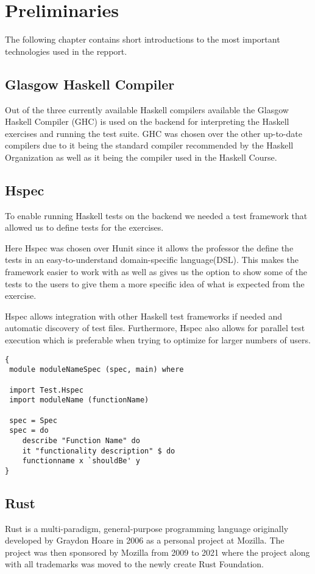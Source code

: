  \chapter{Preliminaries}
The following chapter contains short introductions to the most important technologies used in the repport. 

\section{Glasgow Haskell Compiler} %
Out of the three currently available Haskell compilers available the Glasgow Haskell Compiler (GHC) is used on the backend for interpreting the Haskell exercises and running the test suite. GHC was chosen over the other up-to-date compilers due to it being the standard compiler recommended by the Haskell Organization \cite{Haskell_GHC} as well as it being the compiler used in the Haskell Course.

\section{Hspec}
To enable running Haskell tests on the backend we needed a test framework that allowed us to define tests for the exercises. 

Here Hspec was chosen over Hunit since it allows the professor the define the tests in an easy-to-understand domain-specific language(DSL). 
This makes the framework easier to work with as well as gives us the option to show some of the tests to the users to give them a more specific idea of what is expected from the exercise.

Hspec allows integration with other Haskell test frameworks if needed and automatic discovery of test files. 
Furthermore, Hspec also allows for parallel test execution which is preferable when trying to optimize for larger numbers of users.

\begin{lstlisting}[language=CSharp, caption={An example of a Hspec Test.}, label={lst:HspecTestExample}]
{
 module moduleNameSpec (spec, main) where

 import Test.Hspec
 import moduleName (functionName)
 
 spec = Spec
 spec = do
 	describe "Function Name" do
 	it "functionality description" $ do
	functionname x `shouldBe' y
}
\end{lstlisting}

\section{Rust}
Rust is a multi-paradigm, general-purpose programming language originally developed by Graydon Hoare in 2006 as a personal project at Mozilla. 
The project was then sponsored by Mozilla from 2009 to 2021 where the project along with all trademarks was moved to the newly create Rust Foundation. 

